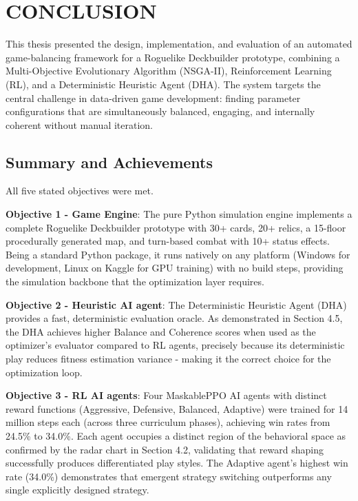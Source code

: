 \clearpage
{}
\chapter*{CONCLUSION}
\label{chap:conclusion}

This thesis presented the design, implementation, and evaluation of an automated game-balancing framework for a Roguelike Deckbuilder prototype, combining a Multi-Objective Evolutionary Algorithm (NSGA-II), Reinforcement Learning (RL), and a Deterministic Heuristic Agent (DHA). The system targets the central challenge in data-driven game development: finding parameter configurations that are simultaneously balanced, engaging, and internally coherent without manual iteration.

\section*{Summary and Achievements}

All five stated objectives were met.

\textbf{Objective 1 - Game Engine}: The pure Python simulation engine implements a complete Roguelike Deckbuilder prototype with 30+ cards, 20+ relics, a 15-floor procedurally generated map, and turn-based combat with 10+ status effects. Being a standard Python package, it runs natively on any platform (Windows for development, Linux on Kaggle for GPU training) with no build steps, providing the simulation backbone that the optimization layer requires.

\textbf{Objective 2 - Heuristic AI agent}: The Deterministic Heuristic Agent (DHA) provides a fast, deterministic evaluation oracle. As demonstrated in Section 4.5, the DHA achieves higher Balance and Coherence scores when used as the optimizer's evaluator compared to RL agents, precisely because its deterministic play reduces fitness estimation variance - making it the correct choice for the optimization loop.

\textbf{Objective 3 - RL AI agents}: Four MaskablePPO AI agents with distinct reward functions (Aggressive, Defensive, Balanced, Adaptive) were trained for 14 million steps each (across three curriculum phases), achieving win rates from 24.5\% to 34.0\%. Each agent occupies a distinct region of the behavioral space as confirmed by the radar chart in Section 4.2, validating that reward shaping successfully produces differentiated play styles. The Adaptive agent's highest win rate (34.0\%) demonstrates that emergent strategy switching outperforms any single explicitly designed strategy.

